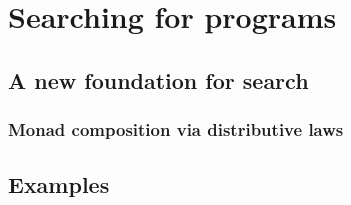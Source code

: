 \section{Searching for programs}

\subsection{A new foundation for search}

\subsubsection{Monad composition via distributive laws}

\subsection{Examples}
